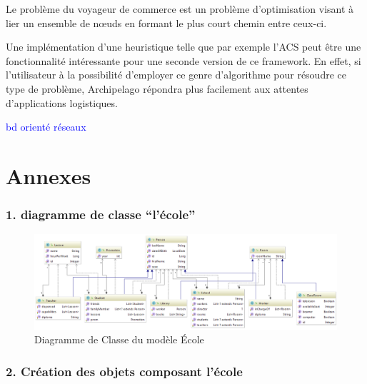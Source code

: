 \documentclass[a4paper,fleqn,12pt]{report}
\begin{document}
Le problème du voyageur de commerce est un problème d'optimisation visant à lier un ensemble de nœuds en formant le plus court chemin entre ceux-ci.

Une implémentation d'une heuristique telle que par exemple l'ACS\cite{dorigo1997ant} peut être une fonctionnalité intéressante pour une seconde version de ce framework. En effet, si l'utilisateur à la possibilité d'employer ce genre d'algorithme pour résoudre ce type de problème, Archipelago répondra plus facilement aux attentes d'applications logistiques.



\textcolor{blue}{bd orienté réseaux}\cite{gardarin2003base}

\nocite{*}

 

\part{Annexes}
\section*{1. diagramme de classe \enquote{l'école}}

\begin{figure}[!ht]
	\centering
    \includegraphics[angle=90,origin=c,scale=0.8]{figures/SchoolDiag.png}
    \caption{Diagramme de Classe du modèle École}
    \label{fig:SchoolDiagram}
\end{figure}

\section*{2. Création des objets composant l'école}
\end{document}
